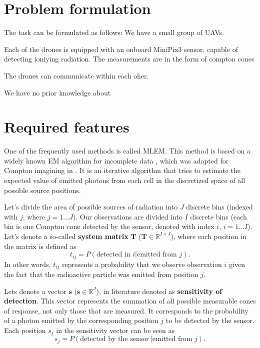 \section{Problem formulation}
The task can be formulated as follows:
We have a small group of \ac{UAV}s.

Each of the drones is equipped with an onboard MiniPix3 sensor, capable of detecting ioniying radiation.
The measurements are in the form of compton cones

The drones can communicate within each oher. 

We have no prior knowledge about 










\section{Required features}

One of the frequently used methods is called \ac{MLEM}.
This method is based on a widely known EM algorithm for incomplete data \cite{EM}, which was adapted for Compton imagining in \cite{wilderman}.
It is an iterative algorithm that tries to estimate the expected value of emitted photons from each cell in the discretized space of all possible source positions.

Let's divide the area of possible sources of radiation into $J$ discrete bins (indexed with $j$, where $j = 1 \dotsc J$).
Our observations are divided into $I$ discrete bins (each bin is one Compton cone detected by the sensor, denoted with index $i$, $i = 1 \dotsc I$).
Let's denote a so-called \textbf{system matrix} $\mathbf{T}$ ($\mathbf{T} \in \mathbb{R}^{I \times J}$), where each position in the matrix is defined as
\begin{equation}
  t_{ij} =  P(\textrm{detected in } i | \textrm{emitted from } j).
\end{equation}
In other words, $t_{ij}$ represents a probability that we observe observation $i$ given the fact that the radioactive particle was emitted from position $j$.

Lets denote a vector $\mathbf{s}$ ($\mathbf{s} \in \mathbb{R}^{J}$), in literature denoted as \textbf{sensitivity of detection}.
This vector represents the summation of all possible measurable cones of response, not only those that are measured.
It corresponds to the probability of a photon emitted by the corresponding position $j$ to be detected by the sensor.
Each position $s_{j}$ in the sensitivity vector can be seen as 
\begin{equation}
  s_{j} =  P(\textrm{detected by the sensor}\ | \textrm{emitted from } j).
\end{equation}

